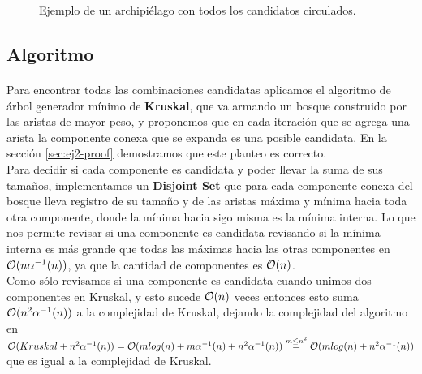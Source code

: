 \documentclass[../main.tex]{subfiles}
\begin{document}
\begin{figure}[H]
\centering

  
\caption{Ejemplo de un archipiélago con todos los candidatos circulados.}
\label{fig:ej2-ex}
\end{figure}

\subsection{Algoritmo}
\label{sec:ej2-algorithm}
\paragraph{} Para encontrar todas las combinaciones candidatas aplicamos el algoritmo de árbol generador mínimo de \textbf{Kruskal}, que va armando un bosque construido por las aristas de mayor peso, y proponemos que en cada iteración que se agrega una arista la componente conexa que se expanda es una posible candidata. En la sección \ref{sec:ej2-proof} demostramos que este planteo es correcto. \\
Para decidir si cada componente es candidata y poder llevar la suma de sus tamaños, implementamos un \textbf{Disjoint Set} que para cada componente conexa del bosque lleva registro de su tamaño y de las aristas máxima y mínima hacia toda otra componente, donde la mínima hacia sigo misma es la mínima interna. Lo que nos permite revisar si una componente es candidata revisando si la mínima interna es más grande que todas las máximas hacia las otras componentes en \(\mathcal{O}(n\alpha^{-1}(n))\), ya que la cantidad de componentes es \(\mathcal{O}(n)\). \\
Como sólo revisamos si una componente es candidata cuando unimos dos componentes en Kruskal, y esto sucede \(\mathcal{O}(n)\) veces entonces esto suma \(\mathcal{O}(n^{2}\alpha^{-1}(n))\) a la complejidad de Kruskal, dejando la complejidad del algoritmo en \(\mathcal{O}(Kruskal + n^{2}\alpha^{-1}(n)) = \mathcal{O}(mlog(n) + m\alpha^{-1}(n) +n^{2}\alpha^{-1}(n)) \overset{m \leq n^{2}}{=} \mathcal{O}(mlog(n) + n^{2}\alpha^{-1}(n))\) que es igual a la complejidad de Kruskal.
\end{document}
